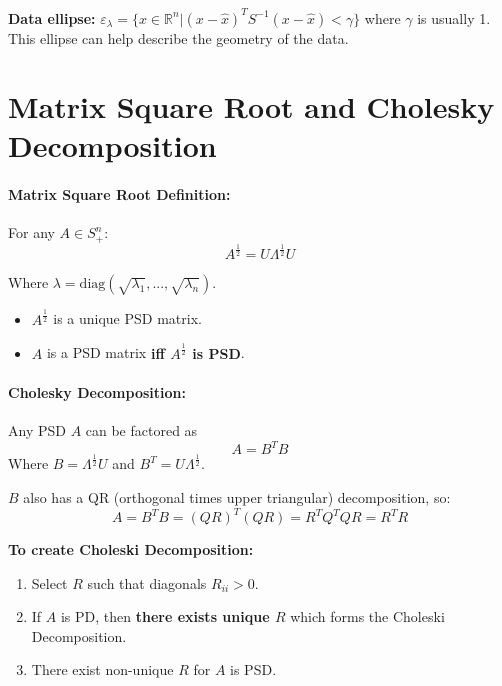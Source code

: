 \documentclass[a4paper,12pt]{report}
\def\reals{\mathbb{R}}
\begin{document}
\textbf{Data ellipse: } $\varepsilon_\lambda = \{x\in \reals^n | (x-\hat{x})^T S^{-1} (x-\hat{x}) < \gamma\}$ where $\gamma$ is usually 1. This ellipse can help describe the geometry of the data.


\section{Matrix Square Root and Cholesky Decomposition}

\paragraph{Matrix Square Root Definition: } For any $A\in S_+^n$: 
\begin{equation}
	A^{\frac{1}{2}} = U\Lambda^{\frac{1}{2}} U
\end{equation}

Where $\lambda = \text{diag}(\sqrt{\lambda_1}, ..., \sqrt{\lambda_n})$.
\begin{itemize}
\item $A^\frac{1}{2}$ is a unique PSD matrix.
\item $A$ is a PSD matrix \textbf{iff $A^{\frac{1}{2}}$ is PSD}.
\end{itemize}

\paragraph{Cholesky Decomposition: } Any PSD $A$ can be factored as 
\begin{equation}
	A = B^T B
\end{equation}
Where $B = \Lambda^{\frac{1}{2}} U$ and $B^T = U\Lambda^{\frac{1}{2}}$.


$B$ also has a QR (orthogonal times upper triangular) decomposition, so: 
\begin{equation}
	A = B^T B = (QR)^T(QR) = R^TQ^TQR = R^TR
\end{equation}

\textbf{To create Choleski Decomposition: } 
\begin{enumerate}
\item Select $R$ such that diagonals $R_{ii} > 0$.
\item If $A$ is PD, then \textbf{there exists unique $R$} which forms the Choleski Decomposition.
\item There exist non-unique $R$ for $A$ is PSD.
\end{enumerate}
\end{document}
